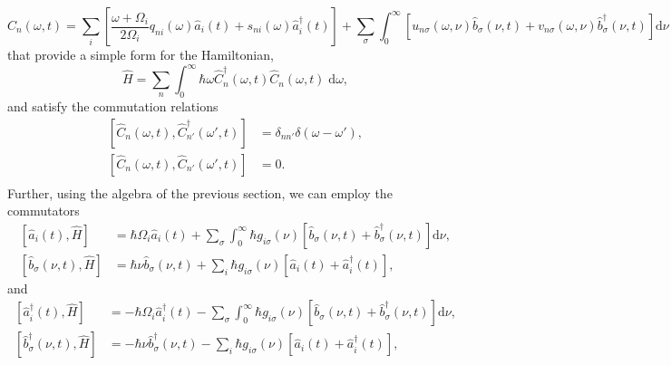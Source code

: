 \begin{equation}\label{eq:hybridOperatorDefinition}
\hat{C}_n(\omega,t) = \sum_i\left[\frac{\omega + \Omega_i}{2\Omega_i}q_{ni}(\omega)\hat{a}_i(t) + s_{ni}(\omega)\hat{a}^\dagger_i(t)\right] + \sum_\sigma\int_0^\infty\left[u_{n\sigma}(\omega,\nu)\hat{b}_\sigma(\nu,t) + v_{n\sigma}(\omega,\nu)\hat{b}_\sigma^\dagger(\nu,t)\right]\mathrm{d}\nu
\end{equation}
that provide a simple form for the Hamiltonian,
\begin{equation}\label{eq:HdiagManyModes}
\hat{H} = \sum_n\int_0^\infty\hbar\omega\hat{C}_n^\dagger(\omega,t)\hat{C}_n(\omega,t)\;\mathrm{d}\omega,
\end{equation}
and satisfy the commutation relations
\begin{equation}\label{eq:hybridOperatorCommutatorManyModes}
\begin{split}
\left[\hat{C}_n(\omega,t),\hat{C}_{n'}^\dagger(\omega',t)\right] &= \delta_{nn'}\delta(\omega - \omega'),\\
\left[\hat{C}_n(\omega,t),\hat{C}_{n'}(\omega',t)\right] &= 0.\\
\end{split}
\end{equation}
Further, using the algebra of the previous section, we can employ the commutators
\begin{equation}
\begin{split}
\left[\hat{a}_i(t),\hat{H}\right] &= \hbar\Omega_i\hat{a}_i(t) + \sum_\sigma\int_0^\infty\hbar g_{i\sigma}(\nu)\left[\hat{b}_\sigma(\nu,t) + \hat{b}_\sigma^\dagger(\nu,t)\right]\mathrm{d}\nu,\\
\left[\hat{b}_\sigma(\nu,t),\hat{H}\right] &= \hbar\nu \hat{b}_\sigma(\nu,t) + \sum_i\hbar g_{i\sigma}(\nu)\left[\hat{a}_i(t) + \hat{a}_i^\dagger(t)\right],
\end{split}
\end{equation}
and
\begin{equation}
\begin{split}
\left[\hat{a}_i^\dagger(t),\hat{H}\right] &= -\hbar\Omega_i\hat{a}_i^\dagger(t) - \sum_\sigma\int_0^\infty\hbar g_{i\sigma}(\nu)\left[\hat{b}_\sigma(\nu,t) + \hat{b}_\sigma^\dagger(\nu,t)\right]\mathrm{d}\nu,\\
\left[\hat{b}_\sigma^\dagger(\nu,t),\hat{H}\right] &= -\hbar\nu \hat{b}_\sigma^\dagger(\nu,t) - \sum_i\hbar g_{i\sigma}(\nu)\left[\hat{a}_i(t) + \hat{a}_i^\dagger(t)\right],
\end{split}
\end{equation}

